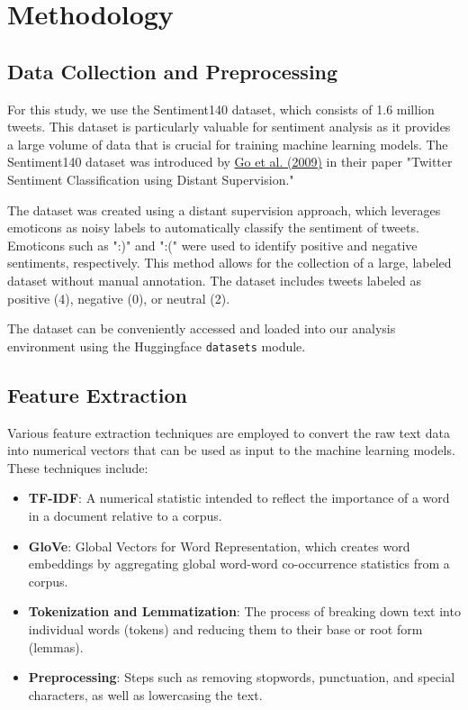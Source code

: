 \documentclass[12pt]{article}
\begin{document}
\section{Methodology}

\subsection{Data Collection and Preprocessing}
For this study, we use the Sentiment140 dataset, which consists of 1.6 million tweets. This dataset is particularly valuable for sentiment analysis as it provides a large volume of data that is crucial for training machine learning models. The Sentiment140 dataset was introduced by \href{https://cs.stanford.edu/people/alecmgo/papers/TwitterDistantSupervision09.pdf}{Go et al. (2009)} in their paper "Twitter Sentiment Classification using Distant Supervision."

The dataset was created using a distant supervision approach, which leverages emoticons as noisy labels to automatically classify the sentiment of tweets. Emoticons such as ":)" and ":(" were used to identify positive and negative sentiments, respectively. This method allows for the collection of a large, labeled dataset without manual annotation. The dataset includes tweets labeled as positive (4), negative (0), or neutral (2).

The dataset can be conveniently accessed and loaded into our analysis environment using the Huggingface \texttt{datasets} module. 


\subsection{Feature Extraction}
Various feature extraction techniques are employed to convert the raw text data into numerical vectors that can be used as input to the machine learning models. These techniques include:
\begin{itemize}
    \item \textbf{TF-IDF}: A numerical statistic intended to reflect the importance of a word in a document relative to a corpus.
    \item \textbf{GloVe}: Global Vectors for Word Representation, which creates word embeddings by aggregating global word-word co-occurrence statistics from a corpus.
    \item \textbf{Tokenization and Lemmatization}: The process of breaking down text into individual words (tokens) and reducing them to their base or root form (lemmas).
    \item \textbf{Preprocessing}: Steps such as removing stopwords, punctuation, and special characters, as well as lowercasing the text.
\end{itemize}
\end{document}
